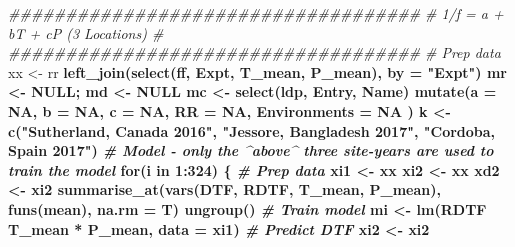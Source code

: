 \documentclass[
]{article}
\newenvironment{Shaded}{\begin{snugshade}}{\end{snugshade}}
\newcommand{\CommentTok}[1]{\textcolor[rgb]{0.56,0.35,0.01}{\textit{#1}}}
\newcommand{\ControlFlowTok}[1]{\textcolor[rgb]{0.13,0.29,0.53}{\textbf{#1}}}
\newcommand{\DataTypeTok}[1]{\textcolor[rgb]{0.13,0.29,0.53}{#1}}
\newcommand{\DecValTok}[1]{\textcolor[rgb]{0.00,0.00,0.81}{#1}}
\newcommand{\KeywordTok}[1]{\textcolor[rgb]{0.13,0.29,0.53}{\textbf{#1}}}
\newcommand{\NormalTok}[1]{#1}
\newcommand{\OperatorTok}[1]{\textcolor[rgb]{0.81,0.36,0.00}{\textbf{#1}}}
\newcommand{\OtherTok}[1]{\textcolor[rgb]{0.56,0.35,0.01}{#1}}
\newcommand{\StringTok}[1]{\textcolor[rgb]{0.31,0.60,0.02}{#1}}
\begin{document}
\begin{Shaded}
\begin{Highlighting}[]
\CommentTok{####################################}
\CommentTok{# 1/f = a + bT + cP (3 Locations) #}
\CommentTok{####################################}
\CommentTok{# Prep data}
\NormalTok{xx <-}\StringTok{ }\NormalTok{rr }\OperatorTok{%
\StringTok{  }\KeywordTok{left_join}\NormalTok{(}\KeywordTok{select}\NormalTok{(ff, Expt, T_mean, P_mean), }\DataTypeTok{by =} \StringTok{"Expt"}\NormalTok{)}
\NormalTok{mr <-}\StringTok{ }\OtherTok{NULL}\NormalTok{; md <-}\StringTok{ }\OtherTok{NULL}
\NormalTok{mc <-}\StringTok{ }\KeywordTok{select}\NormalTok{(ldp, Entry, Name) }\OperatorTok{%
\StringTok{  }\KeywordTok{mutate}\NormalTok{(}\DataTypeTok{a =} \OtherTok{NA}\NormalTok{, }\DataTypeTok{b =} \OtherTok{NA}\NormalTok{, }\DataTypeTok{c =} \OtherTok{NA}\NormalTok{, }\DataTypeTok{RR =} \OtherTok{NA}\NormalTok{, }\DataTypeTok{Environments =} \OtherTok{NA}\NormalTok{ )}
\NormalTok{k <-}\StringTok{ }\KeywordTok{c}\NormalTok{(}\StringTok{"Sutherland, Canada 2016"}\NormalTok{, }\StringTok{"Jessore, Bangladesh 2017"}\NormalTok{, }\StringTok{"Cordoba, Spain 2017"}\NormalTok{)}
\CommentTok{# Model - only the ^above^ three site-years are used to train the model}
\ControlFlowTok{for}\NormalTok{(i }\ControlFlowTok{in} \DecValTok{1}\OperatorTok{:}\DecValTok{324}\NormalTok{) \{}
  \CommentTok{# Prep data}
\NormalTok{  xi1 <-}\StringTok{ }\NormalTok{xx }\OperatorTok{%
\NormalTok{  xi2 <-}\StringTok{ }\NormalTok{xx }\OperatorTok{%
\NormalTok{  xd2 <-}\StringTok{ }\NormalTok{xi2 }\OperatorTok{%
\StringTok{    }\KeywordTok{summarise_at}\NormalTok{(}\KeywordTok{vars}\NormalTok{(DTF, RDTF, T_mean, P_mean), }\KeywordTok{funs}\NormalTok{(mean), }\DataTypeTok{na.rm =}\NormalTok{ T) }\OperatorTok{%
\StringTok{    }\KeywordTok{ungroup}\NormalTok{()}
  \CommentTok{# Train model}
\NormalTok{  mi <-}\StringTok{ }\KeywordTok{lm}\NormalTok{(RDTF }\OperatorTok{~}\StringTok{ }\NormalTok{T_mean }\OperatorTok{*}\StringTok{ }\NormalTok{P_mean, }\DataTypeTok{data =}\NormalTok{ xi1)}
  \CommentTok{# Predict DTF}
\NormalTok{  xi2 <-}\StringTok{ }\NormalTok{xi2 }\OperatorTok{%
}}}}}}}
\end{Highlighting}
\end{Shaded}
\end{document}
